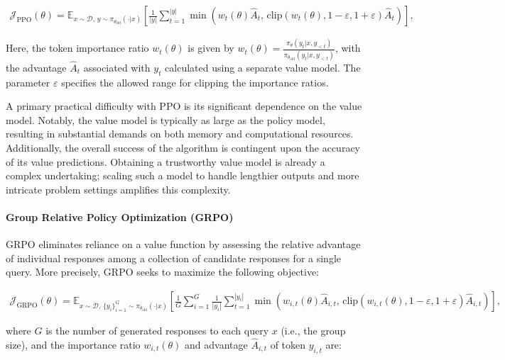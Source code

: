 \begin{align}
\mathcal{J}_\text{PPO}(\theta) = \mathbb{E}_{ x \sim \mathcal{D},\, y \sim \pi_{\theta_\text{old}}( \cdot | x) }
\left[ \frac{1}{|y|} \sum_{t=1}^{|y|} 
\min \left( w_{t}(\theta) \widehat{A}_{t},  \, \mathrm{clip} \left( w_{t}(\theta), 1 - {\varepsilon}, 1 + {\varepsilon}\right) \widehat{A}_{t} \right)
\right],
\end{align}

Here, the token importance ratio $w_{t}(\theta)$ is given by $
w_{t}(\theta) = \frac{ \pi_{\theta} (y_{t} | x, y_{<t}) }{ \pi_{\theta_\text{old}} (y_{t} | x,y_{<t})} $, with the advantage $\widehat{A}_{t}$ associated with $y_t$ calculated using a separate value model. The parameter $\varepsilon$ specifies the allowed range for clipping the importance ratios.

A primary practical difficulty with PPO is its significant dependence on the value model. Notably, the value model is typically as large as the policy model, resulting in substantial demands on both memory and computational resources. Additionally, the overall success of the algorithm is contingent upon the accuracy of its value predictions. Obtaining a trustworthy value model is already a complex undertaking; scaling such a model to handle lengthier outputs and more intricate problem settings amplifies this complexity.

\paragraph{Group Relative Policy Optimization (GRPO)} GRPO \citep{grpo} eliminates reliance on a value function by assessing the relative advantage of individual responses among a collection of candidate responses for a single query. More precisely, GRPO seeks to maximize the following objective:

\begin{align}
\label{equ:grpo}
\mathcal{J}_\text{GRPO}(\theta) = \mathbb{E}_{ x \sim \mathcal{D},\, \{y_i\}_{i=1}^G \sim \pi_{\theta_\text{old}}( \cdot | x) }
\left[ \frac{1}{G} \sum_{i=1}^{G} \frac{1}{|y_i|} \sum_{t=1}^{|y_i|} 
\min \left( w_{i,t}(\theta) \widehat{A}_{i,t},  \, \mathrm{clip} \left( w_{i,t}(\theta), 1 - {\varepsilon}, 1 + {\varepsilon}\right) \widehat{A}_{i,t} \right)
\right],
\end{align}

where $G$ is the number of generated responses to each query $x$ (i.e., the group size), and the importance ratio $w_{i,t}(\theta)$ and advantage $\widehat{A}_{i,t}$ of token $y_{i,t}$ are:

